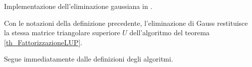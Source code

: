 \begin{listing}
	\caption{Implementazione dell'eliminazione gaussiana in .}
\end{listing}
\begin{Theorem}
  Con le notazioni della definizione precedente, l'eliminazione di Gauss restituisce la stessa
  matrice triangolare superiore $U$ dell'algoritmo del teorema \ref{th_FattorizzazioneLUP}.
\end{Theorem}
\Proof Segue immediatamente dalle definizioni degli algoritmi. \EndProof
